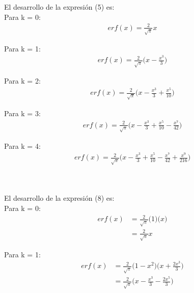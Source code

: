 \documentclass[a4paper]{article}
\begin{document}
El desarrollo de la expresión (5) es:\\

Para k = 0:
\begin{align*}
erf(x)= \frac{2}{\sqrt{\pi}}x
\end{align*}

Para k = 1:
\begin{align*}
erf(x)= \frac{2}{\sqrt{\pi}}
\bigg(x-\frac{x^{3}}{3}\bigg)
\end{align*}

Para k = 2:
\begin{align*}
erf(x)= \frac{2}{\sqrt{\pi}}
\bigg(x-\frac{x^{3}}{3}+\frac{x^{5}}{10}\bigg)
\end{align*}

Para k = 3:
\begin{align*}
erf(x)= \frac{2}{\sqrt{\pi}}
\bigg(x-\frac{x^{3}}{3}+\frac{x^{5}}{10}-\frac{x^{7}}{42}\bigg)
\end{align*}

Para k = 4:
\begin{align*}
erf(x)= \frac{2}{\sqrt{\pi}}
\bigg(x-\frac{x^{3}}{3}+\frac{x^{5}}{10}-\frac{x^{7}}{42}+\frac{x^{9}}{216}\bigg)
\end{align*}\\ \\

\begin{comment}
Para k = 5:
\begin{align*}
erf(x)= \frac{2}{\sqrt{\pi}}
\bigg(x-\frac{x^{3}}{3}+\frac{x^{5}}{10}-\frac{x^{7}}{42}+\frac{x^{9}}{216}-\frac{x^{11}}{1320}\bigg)
\end{align*}

Para k = 6:
\begin{align*}
erf(x)= \frac{2}{\sqrt{\pi}}
\bigg(x-\frac{x^{3}}{3}+\frac{x^{5}}{10}-\frac{x^{7}}{42}+\frac{x^{9}}{216}-\frac{x^{11}}{1320}+\frac{x^{13}}{9360}\bigg)
\end{align*}
\end{comment}

El desarrollo de la expresión (8) es:\\

Para k = 0:
\begin{align*}
erf(x)
&=
\frac{2}{\sqrt{\pi}}\big(1\big)\big(x\big)\\
&=
\frac{2}{\sqrt{\pi}}x
\end{align*}

Para k = 1:
\begin{align*}
erf(x)
&=
\frac{2}{\sqrt{\pi}}\bigg(1-x^{2}\bigg)\bigg(x+\frac{2x^{3}}{3}\bigg)\\
&=
\frac{2}{\sqrt{\pi}}\bigg(x-\frac{x^{3}}{3}-\frac{2x^{5}}{3}\bigg)
\end{align*}
\end{document}
